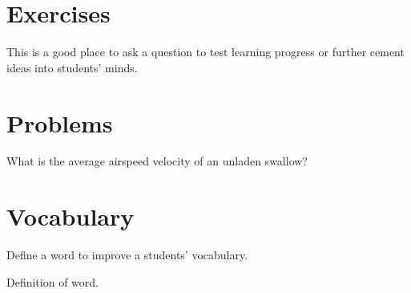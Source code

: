 \documentclass[
	11pt,
	fleqn,
	a4paper,
]{LegrandOrangeBook}
\begin{document}

\section{Exercises}

\begin{exercise} %
	This is a good place to ask a question to test learning progress or further cement ideas into students' minds.
\end{exercise}


\section{Problems}

\begin{problem} %
What is the average airspeed velocity of an unladen swallow?
\end{problem}


\section{Vocabulary}

Define a word to improve a students' vocabulary.

\begin{vocabulary}[Word] %
	Definition of word.
\end{vocabulary}


\chapterspaceabove{6.25cm} %
\chapterspacebelow{7.5cm} %

\end{document}
